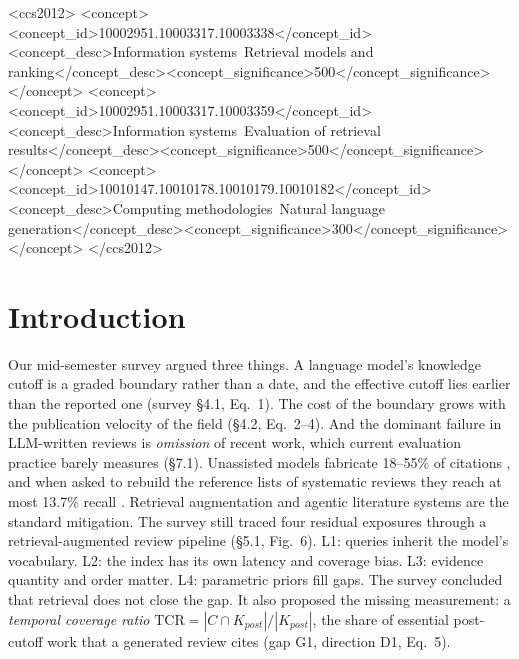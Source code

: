 \documentclass[acmsmall]{acmart}
\begin{document}
\begin{CCSXML}
<ccs2012>
<concept><concept_id>10002951.10003317.10003338</concept_id><concept_desc>Information systems~Retrieval models and ranking</concept_desc><concept_significance>500</concept_significance></concept>
<concept><concept_id>10002951.10003317.10003359</concept_id><concept_desc>Information systems~Evaluation of retrieval results</concept_desc><concept_significance>500</concept_significance></concept>
<concept><concept_id>10010147.10010178.10010179.10010182</concept_id><concept_desc>Computing methodologies~Natural language generation</concept_desc><concept_significance>300</concept_significance></concept>
</ccs2012>
\end{CCSXML}


\maketitle

\section{Introduction}\label{sec:intro}
Our mid-semester survey \cite{ownreview2026} argued three things. A language model's knowledge cutoff is a graded boundary rather than a date, and the effective cutoff lies earlier than the reported one \cite{cheng2024dated} (survey \S4.1, Eq.~1). The cost of the boundary grows with the publication velocity of the field (\S4.2, Eq.~2--4). And the dominant failure in LLM-written reviews is \emph{omission} of recent work, which current evaluation practice barely measures (\S7.1). Unassisted models fabricate 18--55\% of citations \cite{walters2023fabrication}, and when asked to rebuild the reference lists of systematic reviews they reach at most 13.7\% recall \cite{chelli2024hallucination}. Retrieval augmentation \cite{lewis2020rag} and agentic literature systems \cite{shao2024storm,asai2026openscholar,skarlinski2024paperqa2,wang2024autosurvey} are the standard mitigation. The survey still traced four residual exposures through a retrieval-augmented review pipeline (\S5.1, Fig.~6). L1: queries inherit the model's vocabulary. L2: the index has its own latency and coverage bias. L3: evidence quantity and order matter. L4: parametric priors fill gaps. The survey concluded that retrieval does not close the gap. It also proposed the missing measurement: a \emph{temporal coverage ratio} $\mathrm{TCR}=|C\cap K_{post}|/|K_{post}|$, the share of essential post-cutoff work that a generated review cites (gap G1, direction D1, Eq.~5).
\end{document}
